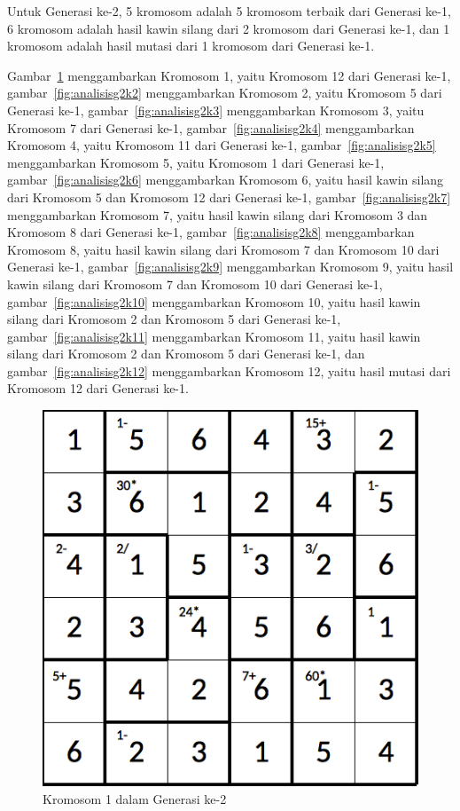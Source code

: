 Untuk Generasi ke-2, 5 kromosom adalah 5 kromosom terbaik dari Generasi ke-1, 6 kromosom adalah hasil kawin silang dari 2 kromosom dari Generasi ke-1, dan 1 kromosom adalah hasil mutasi dari 1 kromosom dari Generasi ke-1.

Gambar~\ref{fig:analisisg2k1} menggambarkan Kromosom 1, yaitu Kromosom 12 dari Generasi ke-1, gambar~\ref{fig:analisisg2k2} menggambarkan Kromosom 2, yaitu Kromosom 5 dari Generasi ke-1, gambar~\ref{fig:analisisg2k3} menggambarkan Kromosom 3, yaitu Kromosom 7 dari Generasi ke-1, gambar~\ref{fig:analisisg2k4} menggambarkan Kromosom 4, yaitu Kromosom 11 dari Generasi ke-1, gambar~\ref{fig:analisisg2k5} menggambarkan Kromosom 5, yaitu Kromosom 1 dari Generasi ke-1, gambar~\ref{fig:analisisg2k6} menggambarkan Kromosom 6, yaitu hasil kawin silang dari Kromosom 5 dan Kromosom 12 dari Generasi ke-1, gambar~\ref{fig:analisisg2k7} menggambarkan Kromosom 7, yaitu hasil kawin silang dari Kromosom 3 dan Kromosom 8 dari Generasi ke-1, gambar~\ref{fig:analisisg2k8} menggambarkan Kromosom 8, yaitu hasil kawin silang dari Kromosom 7 dan Kromosom 10 dari Generasi ke-1, gambar~\ref{fig:analisisg2k9} menggambarkan Kromosom 9, yaitu hasil kawin silang dari Kromosom 7 dan Kromosom 10 dari Generasi ke-1, gambar~\ref{fig:analisisg2k10} menggambarkan Kromosom 10, yaitu hasil kawin silang dari Kromosom 2 dan Kromosom 5 dari Generasi ke-1, gambar~\ref{fig:analisisg2k11} menggambarkan Kromosom 11, yaitu hasil kawin silang dari Kromosom 2 dan Kromosom 5 dari Generasi ke-1, dan gambar~\ref{fig:analisisg2k12} menggambarkan Kromosom 12, yaitu hasil mutasi dari Kromosom 12 dari Generasi ke-1.

\clearpage

\begin{figure}
\centering
\captionsetup{justification=centering}
\includegraphics[scale=0.333]{Gambar/hybridgenetic/Generation2Chromosome1}
\caption[Kromosom 1 dalam Generasi ke-2]{Kromosom 1 dalam Generasi ke-2}
\label{fig:analisisg2k1}
\end{figure}

